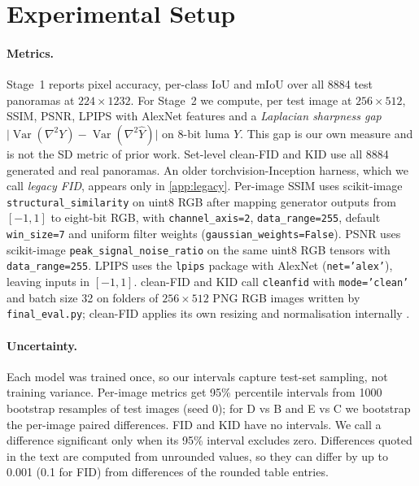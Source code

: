 \documentclass[11pt]{article}
\begin{document}
\section{Experimental Setup}
\label{sec:setup}

\paragraph{Metrics.} Stage~1 reports pixel accuracy, per-class IoU and mIoU over all \num{8884} test panoramas
at $224\times1232$. For Stage~2 we compute, per test image at $256\times512$, SSIM, PSNR, LPIPS with AlexNet
features \cite{zhang2018lpips} and a \emph{Laplacian sharpness gap}
$\lvert\operatorname{Var}(\nabla^2 Y)-\operatorname{Var}(\nabla^2\hat Y)\rvert$ on 8-bit luma $Y$. This gap
is our own measure and is not the SD metric of prior work. Set-level clean-FID \cite{parmar2022cleanfid,
heusel2017fid} and KID \cite{binkowski2018kid} use all \num{8884} generated and real panoramas. An older
torchvision-Inception harness, which we call \emph{legacy FID}, appears only in \cref{app:legacy}. Per-image
SSIM uses scikit-image \texttt{structural\_similarity} on uint8 RGB after mapping generator outputs from
$[-1,1]$ to eight-bit RGB, with \texttt{channel\_axis=2}, \texttt{data\_range=255}, default
\texttt{win\_size=7} and uniform filter weights (\texttt{gaussian\_weights=False}). PSNR uses scikit-image
\texttt{peak\_signal\_noise\_ratio} on the same uint8 RGB tensors with \texttt{data\_range=255}. LPIPS uses
the \texttt{lpips} package with AlexNet (\texttt{net='alex'}), leaving inputs in $[-1,1]$. clean-FID and KID
call \texttt{cleanfid} with \texttt{mode='clean'} and batch size 32 on folders of $256\times512$ PNG RGB images
written by \texttt{final\_eval.py}; clean-FID applies its own resizing and normalisation internally
\cite{parmar2022cleanfid}.

\paragraph{Uncertainty.} Each model was trained once, so our intervals capture test-set sampling, not
training variance. Per-image metrics get 95\% percentile intervals from \num{1000} bootstrap resamples of test
images (seed 0); for D vs B and E vs C we bootstrap the per-image paired differences. FID and KID have no
intervals. We call a difference significant only when its 95\% interval excludes zero. Differences quoted in
the text are computed from unrounded values, so they can differ by up to 0.001 (0.1 for FID) from differences
of the rounded table entries.
\end{document}
